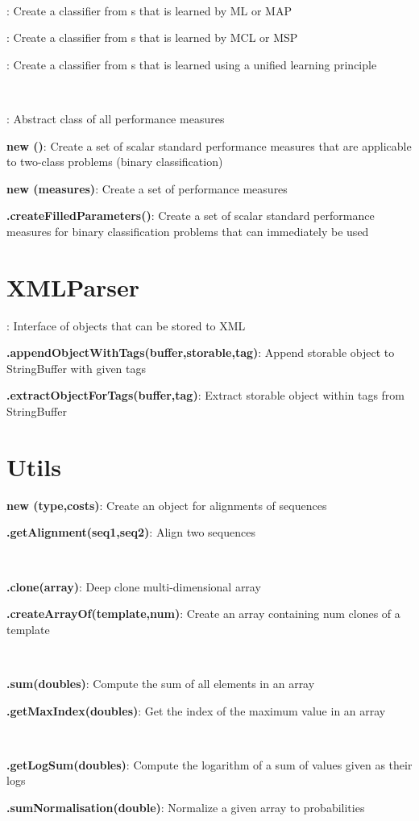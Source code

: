 \documentclass[10pt]{scrartcl}
\newcommand{\entry}[3]{{\bfseries #1#2}: #3}
\begin{document}
\begin{flushleft}
~

\entry{\TrainSMBasedClassifier}{}{Create a classifier from \TrainSM s that is learned by ML or MAP}

\entry{\MSPClassifier}{}{Create a classifier from \DiffSM s that is learned by MCL or MSP}

\entry{\GenDisMixClassifier}{}{Create a classifier from \DiffSM s that is learned using a unified learning principle}

~

\entry{\AbstractPerformanceMeasure}{}{Abstract class of all performance measures}

\entry{new \NumericalPerformanceMeasureParameterSet}{()}{Create a set of scalar standard performance measures that are applicable to two-class problems (binary classification)}

\entry{new \PerformanceMeasureParameterSet}{(measures)}{Create a set of performance measures}

\entry{\PerformanceMeasureParameterSet}{.createFilledParameters()}{Create a set of scalar standard performance measures for binary classification problems that can immediately be used}

\section{XMLParser}

\entry{\Storable}{}{Interface of objects that can be stored to XML}

\entry{\XMLParser}{.appendObjectWithTags(buffer,storable,tag)}{Append storable object to StringBuffer with given tags}

\entry{\XMLParser}{.extractObjectForTags(buffer,tag)}{Extract storable object within tags from StringBuffer}

\section{Utils}

\entry{new \Alignment}{(type,costs)}{Create an object for alignments of sequences}

\entry{\Alignment}{.getAlignment(seq1,seq2)}{Align two sequences}

~

\entry{\ArrayHandler}{.clone(array)}{Deep clone multi-dimensional array}

\entry{\ArrayHandler}{.createArrayOf(template,num)}{Create an array containing num clones of a template}

~

\entry{\ToolBox}{.sum(doubles)}{Compute the sum of all elements in an array}

\entry{\ToolBox}{.getMaxIndex(doubles)}{Get the index of the maximum value in an array}

~

\entry{\Normalisation}{.getLogSum(doubles)}{Compute the logarithm of a sum of values given as their logs}

\entry{\Normalisation}{.sumNormalisation(double)}{Normalize a given array to probabilities}
\end{flushleft}
\end{document}
